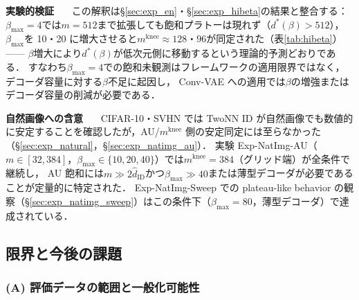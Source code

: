 \documentclass[11pt,a4paper]{jsarticle}
\newcommand{\mknee}{m^{\mathrm{knee}}}
\begin{document}
\textbf{実験的検証}~~~
この解釈は§\ref{sec:exp_en}・§\ref{sec:exp_hibeta}の結果と整合する：
$\beta_{\max}=4$では$m=512$まで拡張しても飽和プラトーは現れず（$d^*(\beta) > 512$），
$\beta_{\max}$を 10・20 に増大させると$\mknee \approx 128$・$96$が同定された（表\ref{tab:hibeta}）——
$\beta$増大により$d^*(\beta)$が低次元側に移動するという理論的予測どおりである．
すなわち$\beta_{\max}=4$での飽和未観測はフレームワークの適用限界ではなく，
デコーダ容量に対する$\beta$不足に起因し，
Conv-VAE への適用では$\beta$の増強またはデコーダ容量の削減が必要である．


\textbf{自然画像への含意}~~~
CIFAR-10・SVHN では TwoNN ID が自然画像でも数値的に安定することを確認したが，AU/$\mknee$ 側の安定同定には至らなかった（§\ref{sec:exp_natural}，§\ref{sec:exp_natimg_au}）．
実験 Exp-NatImg-AU（$m \in [32, 384]$，$\beta_{\max} \in \{10,20,40\}$）では$\mknee = 384$（グリッド端）が全条件で継続し，
AU 飽和には$m \gg 2\hat{d}_\mathrm{ID}$かつ$\beta_{\max} \gg 40$または薄型デコーダが必要であることが定量的に特定された．
Exp-NatImg-Sweep での plateau-like behavior の観察（§\ref{sec:exp_natimg_sweep}）はこの条件下（$\beta_{\max}=80$，薄型デコーダ）で達成されている．

\subsection{限界と今後の課題}\label{sec:disc_limitation}

\subsubsection*{(A) 評価データの範囲と一般化可能性}
\end{document}
